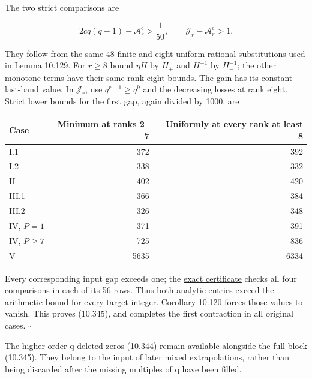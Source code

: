 \documentclass[
  11pt,
  a4paper,
]{article}
\newcounter{none} %
\begin{document}
The two strict comparisons are

\[
2cq(q-1)-\mathcal A_r^{\mathrm c}>\frac1{50},\qquad
\mathcal J_r-\mathcal A_r^{\mathrm c}>1.
\tag{10.348}
\]

They follow from the same 48 finite and eight uniform rational
substitutions used in Lemma 10.129. For \(r\ge8\) bound \(\eta H\) by
\(H_+\) and \(H^{-1}\) by \(H_-^{-1}\); the other monotone terms have
their same rank-eight bounds. The gain has its constant last-band value.
In \(\mathcal J_r\), use \(q^{r+1}\ge q^9\) and the decreasing losses at
rank eight. Strict lower bounds for the first gap, again divided by
1000, are

{\def\LTcaptype{none} %
\begin{longtable}[]{@{}lrr@{}}
\toprule\noalign{}
Case & Minimum at ranks 2--7 & Uniformly at every rank at least 8 \\
\midrule\noalign{}
\endhead
\bottomrule\noalign{}
\endlastfoot
I.1 & 372 & 392 \\
I.2 & 338 & 332 \\
II & 402 & 420 \\
III.1 & 366 & 384 \\
III.2 & 326 & 348 \\
IV, \(P=1\) & 371 & 391 \\
IV, \(P\ge7\) & 725 & 836 \\
V & 5635 & 6334 \\
\end{longtable}
}

Every corresponding input gap exceeds one; the
\href{../figure_sources/first_fractional_bounds.py}{exact certificate}
checks all four comparisons in each of its 56 rows. Thus both analytic
entries exceed the arithmetic bound for every target integer. Corollary
10.120 forces those values to vanish. This proves (10.345), and
completes the first contraction in all original cases. \(\square\)

The higher-order q-deleted zeros (10.344) remain available alongside the
full block (10.345). They belong to the input of later mixed
extrapolations, rather than being discarded after the missing multiples
of q have been filled.
\end{document}
